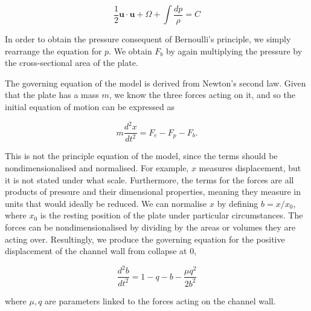 \documentclass{article}
\begin{document}
\begin{equation}
    \frac{1}{2}\mathbf{u}\cdot\mathbf{u} + \Omega + \int\frac{dp}{\rho} = C
    \label{eqn:bernoulli}
\end{equation}

In order to obtain the pressure consequent of Bernoulli's principle, we simply rearrange the equation for $p$.
We obtain $F_b$ by again multiplying the pressure by the cross-sectional area of the plate.


The governing equation of the model is derived from Newton's second law.
Given that the plate has a mass $m$, we know the three forces acting on it,
and so the initial equation of motion can be expressed as

\begin{equation}
    m\frac{d^2 x}{dt^2} = F_e - F_p - F_b.
    \label{eqn:model_init}
\end{equation}

This is not the principle equation of the model,
since the terms should be nondimensionalised and normalised.
For example, $x$ measures displacement,
but it is not stated under what scale.
Furthermore, the terms for the forces are all products of pressure and their dimensional properties,
meaning they measure in units that would ideally be reduced.
We can normalise $x$ by defining $b = x/x_0$, where $x_0$ is the resting position of the plate under particular circumstances. %
The forces can be nondimensionalised by dividing by the areas or volumes they are acting over.
Resultingly, we produce the governing equation for the positive displacement of the channel wall from collapse at $0$,

\begin{equation}
    \frac{d^2b}{dt^2} = 1 - q - b - \frac{\mu q^2}{2b^2}
    \label{eqn:master}
\end{equation}

where $\mu, q$ are parameters linked to the forces acting on the channel wall.

\end{document}
